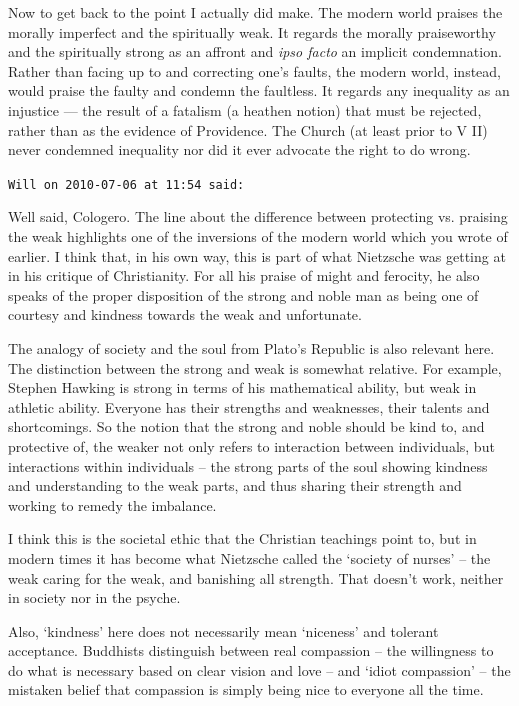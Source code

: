 \begin{footnotesize}
\begin{sffamily}
Now to get back to the point I actually did make. The modern world praises the morally imperfect and the spiritually weak. It regards the morally praiseworthy and the spiritually strong as an affront and
\emph{ipso facto} an implicit condemnation. Rather than facing up to and correcting one's faults, the modern world, instead, would praise the faulty and condemn the faultless. It regards any inequality as an injustice --- the result of a fatalism (a heathen notion) that must be rejected, rather than as the evidence of Providence. The Church (at least prior to V II) never condemned inequality nor did it ever advocate the right to do wrong.

\hfill

\texttt{Will on 2010-07-06 at 11:54 said:}

Well said, Cologero. The line about the difference between protecting vs. praising the weak highlights one of the inversions of the modern world which you wrote of earlier. I think that, in his own way, this is part of what Nietzsche was getting at in his critique of Christianity. For all his praise of might and ferocity, he also speaks of the proper disposition of the strong and noble man as being one of courtesy and kindness towards the weak and unfortunate.

The analogy of society and the soul from Plato's Republic is also relevant here. The distinction between the strong and weak is somewhat relative. For example, Stephen Hawking is strong in terms of his mathematical ability, but weak in athletic ability. Everyone has their strengths and weaknesses, their talents and shortcomings. So the notion that the strong and noble should be kind to, and protective of, the weaker not only refers to interaction between individuals, but interactions within individuals -- the strong parts of the soul showing kindness and understanding to the weak parts, and thus sharing their strength and working to remedy the imbalance.

I think this is the societal ethic that the Christian teachings point to, but in modern times it has become what Nietzsche called the `society of nurses' -- the weak caring for the weak, and banishing all strength. That doesn't work, neither in society nor in the psyche.

Also, `kindness' here does not necessarily mean `niceness' and tolerant acceptance. Buddhists distinguish between real compassion -- the willingness to do what is necessary based on clear vision and love -- and `idiot compassion' -- the mistaken belief that compassion is simply being nice to everyone all the time.


\hfill

\end{sffamily}
\end{footnotesize}

